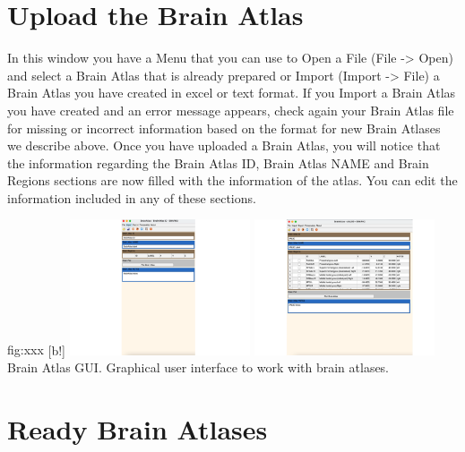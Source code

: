 \documentclass{tufte-handout}
\begin{document}
\clearpage
\section{Upload the Brain Atlas}

In this window you have a Menu that you can use to Open a File (File -> Open) and select a Brain Atlas that is already prepared or Import (Import -> File) a Brain Atlas you have created in excel or text format. If you Import a Brain Atlas you have created and an error message appears, check again your Brain Atlas file for missing or incorrect information based on the format for new Brain Atlases we describe above. 
Once you have uploaded a Brain Atlas, you will notice that the information regarding the Brain Atlas ID, Brain Atlas NAME and Brain Regions sections are now filled with the information of the atlas. You can edit the information included in any of these sections. 

	{fig:xxx}
	{
	[b!]
	\includegraphics[height=4cm]{tut_ba/fig7.png}
	\includegraphics[height=4cm]{tut_ba/fig8.png}
	}
	{Brain Atlas GUI.}
	{
	Graphical user interface to work with brain atlases. 
	}

\clearpage
\section{Ready Brain Atlases}
\end{document}
